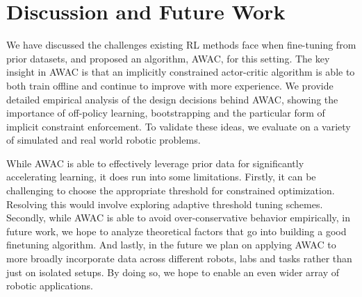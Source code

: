 \section{Discussion and Future Work}\label{sec:conclusion}

We have discussed the challenges existing RL methods face when fine-tuning from prior datasets, and proposed an algorithm, AWAC, for this setting. The key insight in AWAC is that an implicitly constrained actor-critic algorithm is able to both train offline and continue to improve with more experience. We provide detailed empirical analysis of the design decisions behind AWAC, showing the importance of off-policy learning, bootstrapping and the particular form of implicit constraint enforcement. To validate these ideas, we evaluate on a variety of simulated and real world robotic problems. 

While AWAC is able to effectively leverage prior data for significantly accelerating learning, it does run into some limitations. Firstly, it can be challenging to choose the appropriate threshold for constrained optimization. Resolving this would involve exploring adaptive threshold tuning schemes. Secondly, while AWAC is able to avoid over-conservative behavior empirically, in future work, we hope to analyze theoretical factors that go into building a good finetuning algorithm. And lastly, in the future we plan on applying AWAC to more broadly incorporate data across different robots, labs and tasks rather than just on isolated setups. By doing so, we hope to enable an even wider array of robotic applications.
